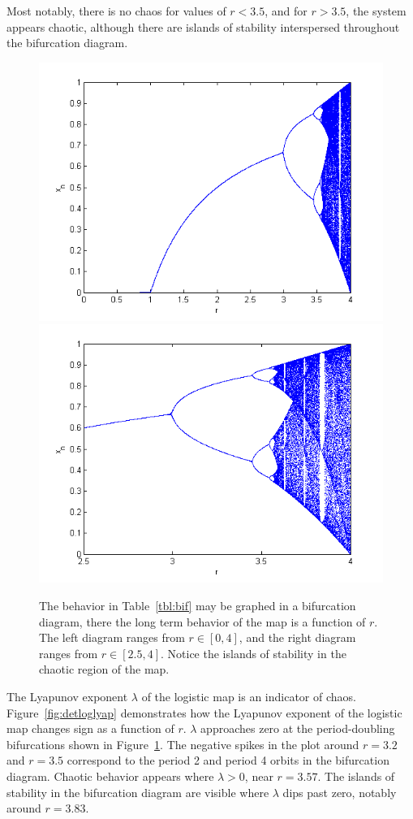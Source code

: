 Most notably, there is no chaos for values of $r
< 3.5$, and for $r > 3.5$, the system appears chaotic, although
there are islands of stability interspersed throughout the bifurcation
diagram. 
\begin{figure}[!h]
\caption[Bifurcation diagram for the deterministic logistic map]{The
  behavior in Table~\ref{tbl:bif} may be graphed in a bifurcation
  diagram, there the long term behavior of the map is a function of $r$. The left diagram ranges from $r\in
  [0,4]$, and the right diagram ranges from $r\in [2.5,4]$. Notice the
  islands of stability in the chaotic region of the map.}\label{fig:bif}
\centering
\includegraphics[width=.5\textwidth]{figs/det_bif_1.png}\hfill
\includegraphics[width=.5\textwidth]{figs/det_bif_2.png}
\end{figure}
The Lyapunov exponent $\lambda$ of the logistic map is an indicator of
chaos. Figure~\ref{fig:detloglyap} demonstrates how the Lyapunov
exponent of the logistic map changes sign as a function of
$r$. $\lambda$ approaches zero at the period-doubling bifurcations
shown in Figure~\ref{fig:bif}. The negative spikes in the plot around
$r=3.2$ and $r=3.5$ correspond to the period 2 and period 4 orbits in the
bifurcation diagram. Chaotic behavior appears where $\lambda >0$, near
$r=3.57$. The islands of stability in the bifurcation diagram are
visible where $\lambda$ dips past zero, notably around $r=3.83$.
